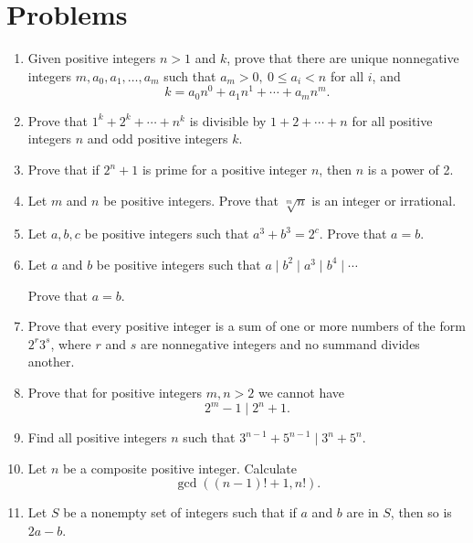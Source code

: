 \documentclass{article}
\begin{document}
\section{Problems}
\begin{enumerate}
  \item Given positive integers $n>1$ and $k$, prove that there are unique
    nonnegative integers $m,a_0,a_1,\ldots,a_m$ such that $a_m>0,\ 0\le
    a_i<n$ for all $i$, and
    \[k=a_0 n^0+a_1 n^1+\cdots+a_m n^m.\]
  \item Prove that $1^k+2^k+\cdots+n^k$ is divisible by $1+2+\cdots+n$ for
    all positive integers $n$ and odd positive integers $k$.
  \item Prove that if $2^n+1$ is prime for a positive integer $n$, then $n$ is
    a power of 2.
  \item Let $m$ and $n$ be positive integers. Prove that $\sqrt[m]n$ is an
    integer or irrational.
  \item Let $a,b,c$ be positive integers such that $a^3+b^3=2^c$. Prove that
    $a=b$.
  \item Let $a$ and $b$ be positive integers such that $a\mid b^2\mid a^3\mid
    b^4\mid\cdots$

    Prove that $a=b$.
  \item Prove that every positive integer is a sum of one or more numbers of
    the form $2^r3^s$, where $r$ and $s$ are nonnegative integers and no
    summand divides another.
  \item Prove that for positive integers $m,n>2$ we cannot have \[2^m-1\mid
      2^n+1.\]
  \item Find all positive integers $n$ such that $3^{n-1}+5^{n-1}\mid
    3^n+5^n$.
  \item Let $n$ be a composite positive integer. Calculate
    \[\gcd((n-1)!+1,n!).\]
  \item Let $S$ be a nonempty set of integers such that if $a$ and $b$ are in $S$, then
    so is $2a-b$.


\end{enumerate}
\end{document}
